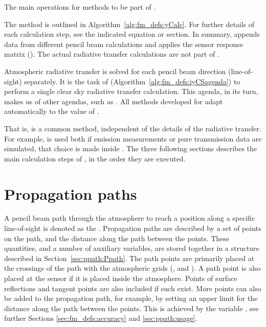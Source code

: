 \begin{algorithm}[t]
 \begin{algorithmic}
 \end{algorithmic}
 \caption{The main operations for methods to be part of
   .}
 \label{alg:fm_defs:iyCSagenda}
\end{algorithm}
The  method is outlined in Algorithm~\ref{alg:fm_defs:yCalc}.
For further details of each calculation step, see the indicated equation or
section. In summary,  appends data from different pencil beam
calculations and applies the sensor response matrix (). The actual
radiative transfer calculations are not part of .

Atmospheric radiative transfer is solved for each pencil beam direction
(line-of-sight) separately. It is the task of 
(Algorithm~\ref{alg:fm_defs:iyCSagenda}) to perform a single clear sky
radiative transfer calculation. This agenda, in its turn, makes us of other
agendas, such as . All methods developed for
 adapt automatically to the value of
.

That is,  is a common method, independent of the details of
the radiative transfer. For example,  is used both if emission
measurements or pure transmission data are simulated, that choice is made
inside . 
The three following sections describes the main calculation steps of 
, in the order they are executed.


\section{Propagation paths}
\label{sec:fm_defs:ppaths}

A pencil beam path through the atmosphere to reach a position along a specific
line-of-sight is denoted as the . Propagation paths
are described by a set of points on the path, and the distance along the path
between the points. These quantities, and a number of auxiliary variables, are
stored together in a structure described in Section~\ref{sec:ppath:Ppath}. The
path points are primarily placed at the crossings of the path with the
atmospheric grids (,  and
). A path point is also placed at the sensor if it is
placed inside the atmosphere. Points of surface reflections and tangent points
are also included if such exist. More points can also be added to the
propagation path, for example, by setting an upper limit for the distance along
the path between the points. This is achieved by the variable
, see further Sections \ref{sec:fm_defs:accuracy} and
\ref{sec:ppath:usage}.

